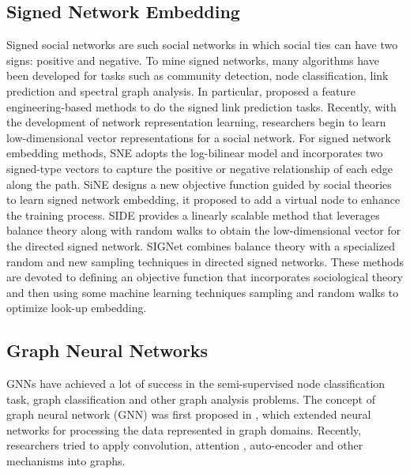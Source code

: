 \documentclass[runningheads]{llncs}
\begin{document}
\subsection{Signed Network Embedding}
Signed social networks are such social networks in which social ties can have two signs: positive and negative\cite{leskovec2010signed}. 
To mine signed networks, many algorithms have been developed for tasks such as community detection, node classification, link prediction and spectral graph analysis.
In particular, \cite{leskovec2010signed} proposed a feature engineering-based methods to do the signed link prediction tasks. 
Recently, with the development of network representation learning\cite{perozzi2014deepwalk, grover2016node2vec, tang2015line}, researchers begin to learn low-dimensional vector representations for a social network.
For signed network embedding methods, SNE\cite{yuan2017sne} adopts the log-bilinear model and incorporates two signed-type vectors to capture the positive or negative relationship of each edge along the path. 
SiNE\cite{wang2017signed} designs a new objective function guided by social theories to learn signed network embedding, it proposed to add a virtual node to enhance the training process. 
SIDE\cite{kim2018side} provides a linearly scalable method that leverages balance theory along with random walks to obtain the low-dimensional vector for the directed signed network. 
SIGNet\cite{islam2018signet} combines balance theory with a specialized random and new sampling techniques in directed signed networks. 
These methods are devoted to defining an objective function that incorporates sociological theory and then using some machine learning techniques \eg sampling and random walks to optimize look-up embedding. 


\subsection{Graph Neural Networks}
GNNs have achieved a lot of success in the semi-supervised node classification task\cite{kipf2016semi}, graph classification\cite{gilmer2017neural} and other graph analysis problems. 
The concept of graph neural network (GNN) was first proposed in \cite{scarselli2009graph}, which extended neural networks for processing the data represented in graph domains. 
Recently, researchers tried to apply convolution\cite{kipf2016semi}, attention\cite{velickovic2017graph} , auto-encoder\cite{kipf2016variational} and other mechanisms into graphs.
\end{document}
